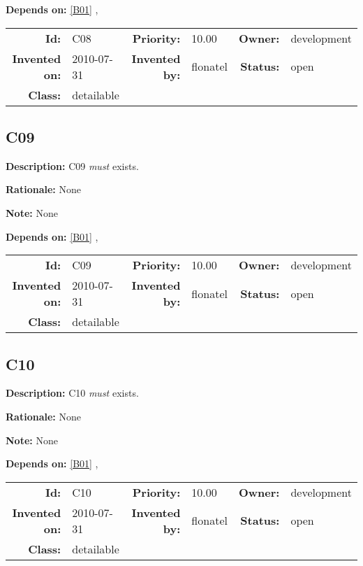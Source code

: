 \textbf{Depends on:} \ref{B01} , 

\par
{\small \begin{center}\begin{tabular}{rlrlrl}
\textbf{Id:} & C08 & \textbf{Priority:} & 10.00 & \textbf{Owner:} & development \\ 
\textbf{Invented on:} & 2010-07-31 & \textbf{Invented by:} & flonatel & \textbf{Status:} & open \\ 
\textbf{Class:} & detailable & & & & \\ 
\end{tabular}\end{center} }%
\subsection{C09}\label{C09}
\textbf{Description:} C09 \textsl{must} exists.

\textbf{Rationale:} None

\textbf{Note:} None

\textbf{Depends on:} \ref{B01} , 

\par
{\small \begin{center}\begin{tabular}{rlrlrl}
\textbf{Id:} & C09 & \textbf{Priority:} & 10.00 & \textbf{Owner:} & development \\ 
\textbf{Invented on:} & 2010-07-31 & \textbf{Invented by:} & flonatel & \textbf{Status:} & open \\ 
\textbf{Class:} & detailable & & & & \\ 
\end{tabular}\end{center} }%
\subsection{C10}\label{C10}
\textbf{Description:} C10 \textsl{must} exists.

\textbf{Rationale:} None

\textbf{Note:} None

\textbf{Depends on:} \ref{B01} , 

\par
{\small \begin{center}\begin{tabular}{rlrlrl}
\textbf{Id:} & C10 & \textbf{Priority:} & 10.00 & \textbf{Owner:} & development \\ 
\textbf{Invented on:} & 2010-07-31 & \textbf{Invented by:} & flonatel & \textbf{Status:} & open \\ 
\textbf{Class:} & detailable & & & & \\ 
\end{tabular}\end{center} }%
